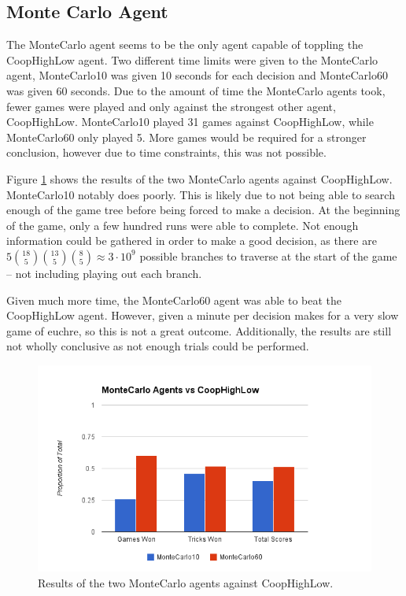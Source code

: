 \subsection{Monte Carlo Agent}

The MonteCarlo agent seems to be the only agent capable of toppling the CoopHighLow agent. Two different time limits were given to the MonteCarlo agent,
MonteCarlo10 was given 10 seconds for each decision and MonteCarlo60 was given 60 seconds. Due to the amount of time the MonteCarlo agents took,
fewer games were played and only against the strongest other agent, CoopHighLow. MonteCarlo10 played 31 games against CoopHighLow, while MonteCarlo60
only played 5. More games would be required for a stronger conclusion, however due to time constraints, this was not possible.

Figure \ref{fig:results_montecarlo} shows the results of the two MonteCarlo agents against CoopHighLow. MonteCarlo10 notably does poorly. This
is likely due to not being able to search enough of the game tree before being forced to make a decision. At the beginning of the game, only
a few hundred runs were able to complete. Not enough information could be gathered in order to make a good decision, as there are
$5 {18 \choose 5}{13 \choose 5}{8 \choose 5} \approx 3 \cdot 10^9$ possible branches to traverse at the start of the game -- not including
playing out each branch.

Given much more time, the MonteCarlo60 agent was able to beat the CoopHighLow agent. However, given a minute per decision makes for a very slow
game of euchre, so this is not a great outcome. Additionally, the results are still not wholly conclusive as not enough trials could be performed. 

\begin{figure}[ht]
    \centering
    \includegraphics[scale=0.5]{data/montecarlo.png}
    \caption{Results of the two MonteCarlo agents against CoopHighLow.}
    \label{fig:results_montecarlo}
\end{figure}

